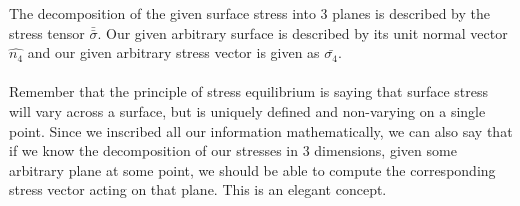 The decomposition of the given surface stress into $3$ planes is described by the stress tensor $\bar{\bar{\sigma}}$.
Our given arbitrary surface is described by its unit normal vector $\hat{n_{4}}$ and our given arbitrary stress vector is given as $\bar{\sigma_{4}}$.
\\~\\Remember that the principle of stress equilibrium is saying that surface stress will vary across a surface, but is uniquely defined and non-varying on a single point.
Since we inscribed all our information mathematically, we can also say that if we know the decomposition of our stresses in $3$ dimensions, given some arbitrary plane at some point, we should be able to compute the corresponding stress vector acting on that plane.
This is an elegant concept.


